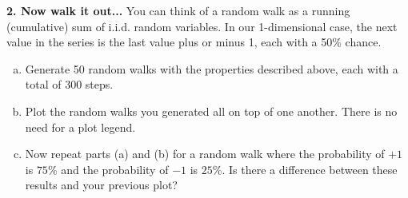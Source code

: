 \documentclass[11pt]{article}
\begin{document}
\noindent
\newline
\textbf{2. Now walk it out...}
You can think of a random walk as a running (cumulative) sum of
i.i.d. random variables. In our 1-dimensional case,
the next value in the series is the last value plus or minus 1, each with 
a 50\% chance.
    
\begin{enumerate}[a.]
    \item  Generate 50 random walks with the properties described above,
    each with a total of 300 steps.
    
    \item  Plot the random walks you generated all on top of one another.
    There is no need for a plot legend.
    
    \item  Now repeat parts (a) and (b) for a random walk where the
    probability of $+1$ is $75\%$ and the probability of $-1$ is $25\%$.
    Is there a difference between these results and your previous plot?
\end{enumerate}
\end{document}
